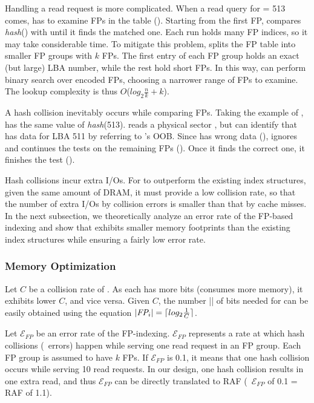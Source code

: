 Handling a read request is more complicated.  When a read query for  = 513
comes, \ours{} has to examine FPs in the table {()}.  Starting
from the first FP, \ours{} compares \textit{hash}() with
 until it finds the matched one.  Each run holds many FP indices,
so it may take considerable time.  To
mitigate this problem, \ours{} splits the FP table into smaller FP groups with $k$ FPs.  
The first entry of each FP group holds an exact (but large) LBA number, while the
rest hold short FPs.  In this way, \ours{} can perform binary
search over encoded FPs, choosing a narrower range of FPs to examine. 
The lookup complexity is thus $O$($log_{2}\frac{n}{k}+k$).

A hash collision inevitably occurs while comparing FPs.
Taking the example of ,  has the same value of 
\textit{hash}(513). \ours{} reads a physical sector ,
but can identify that  has data for LBA 511 by referring 
to 's OOB. Since  has wrong data {()},  \ours{}
ignores  and continues the tests on the remaining FPs ().
Once it finds the correct one, it finishes the test ().

Hash collisions incur extra I/Os.  For \ours{} to outperform the existing
index structures, given the same amount of DRAM, it must
provide a low
collision rate, so that the number of extra I/Os by collision errors 
is smaller than that by cache misses. 
In the next subsection, we
theoretically analyze an error rate of the FP-based indexing and show that \ours{} 
exhibits smaller memory footprints than the existing index structures
while ensuring a fairly low error rate.

\subsubsection{Memory Optimization}

Let $C$ be a collision rate of .  As each  has more bits (consumes
more memory), it exhibits lower $C$, and vice versa.  Given $C$, 
the number || of bits needed for  can be easily obtained using 
the equation $|\textit{FP$_{i}$}| = \lceil log_{2}\frac{1}{C}\rceil$.

Let $\mathcal{E}_{FP}$ be an error rate of the FP-indexing.
$\mathcal{E}_{FP}$
represents a rate at which hash collisions (\ie~errors) happen
while serving one read request in an FP group. Each FP group is assumed to have $k$ FPs.  
If $\mathcal{E}_{FP}$ is 0.1, it means that one hash collision occurs while serving 10
read requests.
In our design,
one hash collision results in one extra read, and thus
$\mathcal{E}_{FP}$
can be directly translated to RAF (\ie~$\mathcal{E}_{FP}$ of 0.1 = RAF of 1.1).

